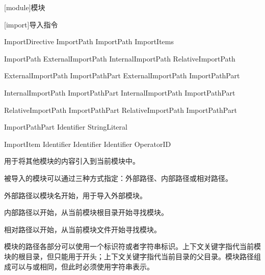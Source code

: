 
[module]{模块}

[import]{导入指令}

\begin{bnf}{ImportDirective}
     ImportPath \terminal{;} \br
     ImportPath \terminal{:} ImportItems \terminal{;}
\end{bnf}

\begin{bnf}{ImportPath}
    ExternalImportPath \br
    InternalImportPath \br
    RelativeImportPath
\end{bnf}

\begin{bnf}{ExternalImportPath}
    ImportPathPart \br
    ExternalImportPath  ImportPathPart
\end{bnf}

\begin{bnf}{InternalImportPath}
      ImportPathPart \br
    InternalImportPath  ImportPathPart
\end{bnf}

\begin{bnf}{RelativeImportPath}
      ImportPathPart \br
    RelativeImportPath  ImportPathPart
\end{bnf}

\begin{bnf}{ImportPathPart}
    Identifier \br
    StringLiteral \br
\end{bnf}

\begin{bnf}{ImportItem}
    \terminal{*} \br
     \br
    Identifier \br
    Identifier  Identifier \br
    OperatorID
\end{bnf}

\pnum
{}用于将其他模块的内容引入到当前模块中。

\pnum
被导入的模块可以通过三种方式指定：外部路径、内部路径或相对路径。

\pnum
外部路径以模块名开始，用于导入外部模块。

\pnum
内部路径以开始，从当前模块根目录开始寻找模块。

\pnum
相对路径以开始，从当前模块文件开始寻找模块。

\pnum
模块的路径各部分可以使用一个标识符或者字符串标识。上下文关键字指代当前模块的根目录，但只能用于开头；上下文关键字指代当前目录的父目录。模块路径组成可以与或相同，但此时必须使用字符串表示。

